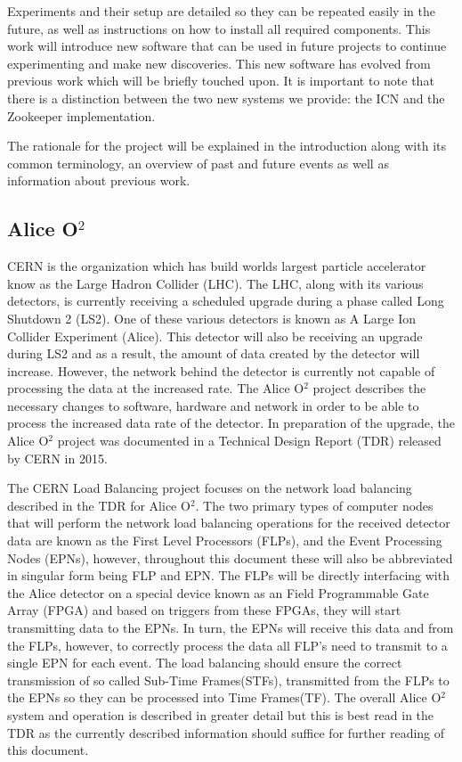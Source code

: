 \documentclass[]{article}
\begin{document}
Experiments and their setup are detailed so they can be repeated easily in the future, as well as instructions on how to install all required components. This work will introduce new software that can be used in future projects to continue experimenting and make new discoveries. This new software has evolved from previous work which will be briefly touched upon. It is important to note that there is a distinction between the two new systems we provide: the ICN and the Zookeeper implementation.

The rationale for the project will be explained in the introduction along with its common terminology, an overview of past and future events as well as information about previous work.

\subsection*{Alice O$^2$}
CERN is the organization which has build worlds largest particle accelerator know as the Large Hadron Collider (LHC). The LHC, along with its various detectors, is currently receiving a scheduled upgrade during a phase called Long Shutdown 2 (LS2). One of these various detectors is known as A Large Ion Collider Experiment (Alice). This detector will also be receiving an upgrade during LS2 and as a result, the amount of data created by the detector will increase. However, the network behind the detector is currently not capable of processing the data at the increased rate. The Alice O$^2$ project describes the necessary changes to software, hardware and network in order to be able to process the increased data rate of the detector. In preparation of the upgrade, the Alice O$^2$ project was documented in a Technical Design Report (TDR) released by CERN in 2015\cite{Buncic:2011297}.

The CERN Load Balancing project focuses on the network load balancing described in the TDR for Alice O$^2$. The two primary types of computer nodes that will perform the network load balancing operations for the received detector data are known as the First Level Processors (FLPs), and the Event Processing Nodes (EPNs), however, throughout this document these will also be abbreviated in singular form being FLP and EPN. The FLPs will be directly interfacing with the Alice detector on a special device known as an Field Programmable Gate Array (FPGA) and based on triggers from these FPGAs, they will start transmitting data to the EPNs. In turn, the EPNs will receive this data and from the FLPs, however, to correctly process the data all FLP's need to transmit to a single EPN for each event. The load balancing should ensure the correct transmission of so called Sub-Time Frames(STFs), transmitted from the FLPs to the EPNs so they can be processed into Time Frames(TF). The overall Alice O$^2$ system and operation is described in greater detail but this is best read in the TDR\cite{Buncic:2011297} as the currently described information should suffice for further reading of this document.
\end{document}
